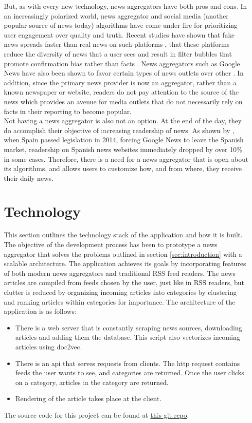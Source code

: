 \documentclass[12pt]{article}
\begin{document}
But, as with every new technology, news aggregators have both pros and cons. In an increasingly polarized world, news aggregator and social media (another popular source of news today) algorithms have come under fire for prioritizing user engagement over quality and truth. Recent studies have shown that fake news spreads faster than real news on such platforms \cite{Vosoughi18}, that these platforms reduce the diversity of news that a user sees \cite{claussens19} and result in filter bubbles \cite{berman20} that promote confirmation bias rather than facts \cite{hu19, ling20}. News aggregators such as Google News have also been shown to favor certain types of news outlets over other \cite{fischer20}. In addition, since the primary news provider is now an aggregator, rather than a known newspaper or website, readers do not pay attention to the source of the news \cite{antonis19} which provides an avenue for media outlets that do not necessarily rely on facts in their reporting to become popular.\\

Not having a news aggregator is also not an option. At the end of the day, they do accomplish their objective of increasing readership of news. As shown by \cite{calzada20}, when Spain passed legislation in 2014, forcing Google News to leave the Spanish market, readership on Spanish news websites immediately dropped by over 10\% in some cases. Therefore, there is a need for a news aggregator that is open about its algorithms, and allows users to customize how, and from where, they receive their daily news.

\section{Technology}

This section outlines the technology stack of the application and how it is built. The objective of the development process has been to prototype a news aggregator that solves the problems outlined in section \ref{sec:introduction} with a scalable architecture. The application achieves its goals by incorporating features of both modern news aggregators and traditional RSS feed readers. The news articles are compiled from feeds chosen by the user, just like in RSS readers, but clutter is reduced by organizing incoming articles into categories by clustering and ranking articles within categories for importance. The architecture of the application is as follows:
\begin{itemize}
  \item There is a web server that is constantly scraping news sources, downloading articles and adding them the database. This script also vectorizes incoming articles using doc2vec.
  \item There is an api that serves requests from clients. The http request contains feeds the user wants to see, and categories are returned. Once the user clicks on a category, articles in the category are returned. 
  \item Rendering of the article takes place at the client.
\end{itemize}
The source code for this project can be found at \href{https://www.github.com/pranav-dahiya/News}{this git repo}.
\end{document}

